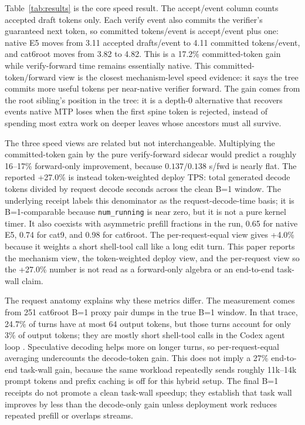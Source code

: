 \documentclass[conference]{IEEEtran}
\newcommand{\code}[1]{\texttt{#1}}
\begin{document}
Table~\ref{tab:results} is the core speed result. The accept/event column counts accepted draft tokens only. Each verify event also commits the verifier's guaranteed next token, so committed tokens/event is accept/event plus one: native E5 moves from 3.11 accepted drafts/event to 4.11 committed tokens/event, and cat6root moves from 3.82 to 4.82. This is a 17.2\% committed-token gain while verify-forward time remains essentially native. This committed-token/forward view is the closest mechanism-level speed evidence: it says the tree commits more useful tokens per near-native verifier forward. The gain comes from the root sibling's position in the tree: it is a depth-0 alternative that recovers events native MTP loses when the first spine token is rejected, instead of spending most extra work on deeper leaves whose ancestors must all survive.

The three speed views are related but not interchangeable. Multiplying the committed-token gain by the pure verify-forward sidecar would predict a roughly 16--17\% forward-only improvement, because \(0.137/0.138\) s/fwd is nearly flat. The reported +27.0\% is instead token-weighted deploy TPS: total generated decode tokens divided by request decode seconds across the clean B=1 window. The underlying receipt labels this denominator as the request-decode-time basis; it is B=1-comparable because \code{num\_running} is near zero, but it is not a pure kernel timer. It also coexists with asymmetric prefill fractions in the run, 0.65 for native E5, 0.74 for cat9, and 0.98 for cat6root. The per-request-equal view gives +4.0\% because it weights a short shell-tool call like a long edit turn. This paper reports the mechanism view, the token-weighted deploy view, and the per-request view so the +27.0\% number is not read as a forward-only algebra or an end-to-end task-wall claim.

The request anatomy explains why these metrics differ. The measurement comes from 251 cat6root B=1 proxy pair dumps in the true B=1 window. In that trace, 24.7\% of turns have at most 64 output tokens, but those turns account for only 3\% of output tokens; they are mostly short shell-tool calls in the Codex agent loop \cite{lumo2026receipts}. Speculative decoding helps more on longer turns, so per-request-equal averaging undercounts the decode-token gain. This does not imply a 27\% end-to-end task-wall gain, because the same workload repeatedly sends roughly 11k--14k prompt tokens and prefix caching is off for this hybrid setup. The final B=1 receipts do not promote a clean task-wall speedup; they establish that task wall improves by less than the decode-only gain unless deployment work reduces repeated prefill or overlaps streams.
\end{document}
